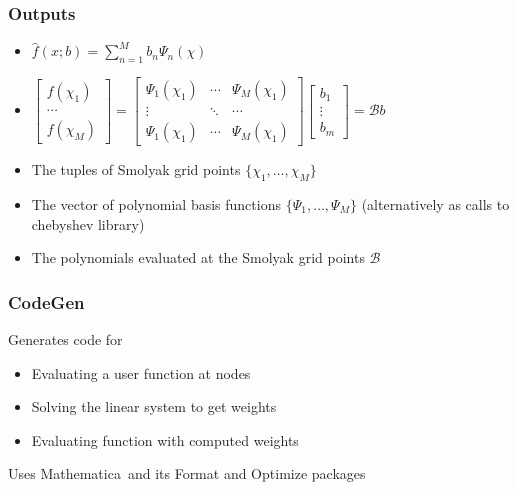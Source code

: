 \documentclass[tikz]{beamer}
\newcommand{\mma}{Mathematica}
\begin{document}

\begin{frame}
  \frametitle{Outputs}
  \begin{itemize}
  \item $\hat{f}(x;b)=\sum_{n=1}^M b_n \Psi_n(\chi)$
  \item $
    \begin{bmatrix}
      f(\chi_1)\\ \cdots \\       f(\chi_M)
    \end{bmatrix}=
      \begin{bmatrix}
        \Psi_1(\chi_1) &\cdots &        \Psi_M(\chi_1)\\
\vdots&\ddots&\cdots\\
        \Psi_1(\chi_1)& \cdots   &      \Psi_M(\chi_1)
      \end{bmatrix}
      \begin{bmatrix}
        b_1\\ \vdots \\ b_m
      \end{bmatrix}= \mathcal{B} b
$
  \item The tuples of Smolyak grid points $\{\chi_1, \ldots , \chi_M\}$
  \item The vector of polynomial basis functions $\{\Psi_1, \ldots , \Psi_M\}$ (alternatively as calls to chebyshev library)
  \item The polynomials evaluated at the Smolyak grid points $\mathcal{B}$
  \end{itemize}
\end{frame}
\begin{frame}
  \frametitle{CodeGen}
Generates code for 

  \begin{itemize}
  \item Evaluating a user function at nodes
  \item Solving the linear system to get weights
  \item Evaluating function with computed weights
  \end{itemize}

 Uses \mma\   and  its Format and Optimize packages

\end{frame}
\end{document}
